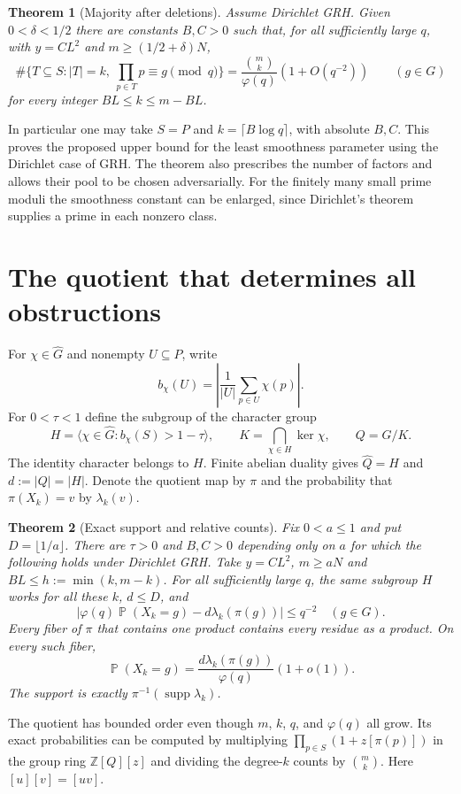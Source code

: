 \documentclass[11pt]{article}
\newtheorem{theorem}{Theorem}[section]
\DeclareMathOperator{\Prob}{\mathbb P}
\begin{document}
\begin{theorem}[Majority after deletions]\label{thm:major}
Assume Dirichlet GRH. Given $0<\delta<1/2$ there are constants $B,C>0$ such that,
for all sufficiently large $q$, with $y=CL^2$ and $m\ge(1/2+\delta)N$,
\[
 \#\{T\subseteq S: |T|=k,\ \textstyle\prod_{p\in T}p\equiv g\pmod q\}
 =\frac{\binom mk}{\varphi(q)}(1+O(q^{-2}))
 \qquad(g\in G)
\]
for every integer $BL\le k\le m-BL$.
\end{theorem}
In particular one may take $S=P$ and $k=\lceil B\log q\rceil$, with
absolute $B,C$. This proves the proposed upper bound for the least smoothness
parameter using the Dirichlet case of GRH. The theorem also prescribes the
number of factors and allows their pool to be chosen adversarially. For the
finitely many small prime moduli the smoothness constant can be enlarged,
since Dirichlet's theorem supplies a prime in each nonzero class.

\section{The quotient that determines all obstructions}
For $\chi\in\widehat G$ and nonempty $U\subseteq P$, write
\[
 b_\chi(U)=\left|\frac1{|U|}\sum_{p\in U}\chi(p)\right|.
\]
For $0<\tau<1$ define the subgroup of the character group
\[
 H=\langle\chi\in\widehat G:b_\chi(S)>1-\tau\rangle,
 \qquad K=\bigcap_{\chi\in H}\ker\chi,\qquad Q=G/K .
\]
The identity character belongs to $H$. Finite abelian duality gives
$\widehat Q=H$ and $d:=|Q|=|H|$. Denote the quotient map by $\pi$ and the
probability that $\pi(X_k)=v$ by $\lambda_k(v)$.

\begin{theorem}[Exact support and relative counts]\label{thm:main}
Fix $0<a\le1$ and put $D=\lfloor1/a\rfloor$. There are
$\tau>0$ and $B,C>0$ depending only on $a$ for which the following holds under
Dirichlet GRH. Take $y=C L^2$, $m\ge aN$ and $BL\le h:=\min(k,m-k)$.
For all sufficiently large $q$, the same subgroup $H$ works for all these $k$,
$d\le D$, and
\begin{equation}\label{eq:profile}
 \left|\varphi(q)\Prob(X_k=g)-d\lambda_k(\pi(g))\right|\le q^{-2}
 \quad (g\in G).
\end{equation}
Every fiber of $\pi$ that contains one product contains every residue as a
product. On every such fiber,
\[
 \Prob(X_k=g)=\frac{d\lambda_k(\pi(g))}{\varphi(q)}(1+o(1)).
\]
The support is exactly $\pi^{-1}(\operatorname{supp}\lambda_k)$.
\end{theorem}
The quotient has bounded order even though $m$, $k$, $q$, and $\varphi(q)$ all
grow. Its exact probabilities can be computed by multiplying
$\prod_{p\in S}(1+z[\pi(p)])$ in the group ring $\mathbb Z[Q][z]$ and
dividing the degree-$k$ counts by $\binom mk$. Here $[u][v]=[uv]$.
\end{document}
